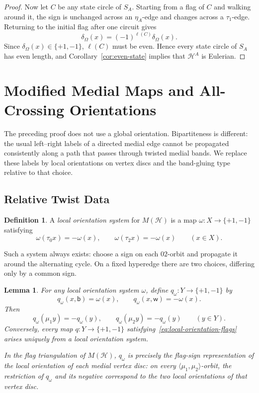\documentclass[10pt,a4paper]{article}
\newtheorem{lemma}[theorem]{Lemma}
\theoremstyle{definition}
\newtheorem{definition}[theorem]{Definition}
\theoremstyle{remark}
\newcommand{\Hcal}{\mathcal{H}}
\begin{document}
\begin{proof}
Now let $C$ be any state circle of $S_A$. Starting from a flag of $C$ and walking around it, the sign is unchanged across an $\eta_A$-edge and changes across a $\tau_1$-edge. Returning to the initial flag after one circuit gives
\[
  \delta_\Omega(x)=(-1)^{\ell(C)}\delta_\Omega(x).
\]
Since $\delta_\Omega(x)\in\{+1,-1\}$, $\ell(C)$ must be even. Hence every state circle of $S_A$ has even length, and Corollary~\ref{cor:even-state} implies that $\Hcal^A$ is Eulerian.
\end{proof}

\section{Modified Medial Maps and All-Crossing Orientations}

The preceding proof does not use a global orientation. Bipartiteness is different: the usual left--right labels of a directed medial edge cannot be propagated consistently along a path that passes through twisted medial bands. We replace these labels by local orientations on vertex discs and the band-gluing type relative to that choice.

\subsection{Relative Twist Data}

\begin{definition}\label{def:local-orientation}
A \emph{local orientation system} for $M(\Hcal)$ is a map $\omega:X\to\{+1,-1\}$ satisfying
\[
 \omega(\tau_0x)=-\omega(x),\qquad \omega(\tau_2x)=-\omega(x)
 \qquad (x\in X).
\]
\end{definition}

Such a system always exists: choose a sign on each $02$-orbit and propagate it around the alternating cycle. On a fixed hyperedge there are two choices, differing only by a common sign.

\begin{lemma}\label{lem:local-orientation-flags}
For any local orientation system $\omega$, define $q_\omega:Y\to\{+1,-1\}$ by
\[
  q_\omega(x,\mathsf b)=\omega(x),\qquad
  q_\omega(x,\mathsf w)=-\omega(x).
\]
Then
\[
  q_\omega(\mu_1y)=-q_\omega(y),\qquad
  q_\omega(\mu_2y)=-q_\omega(y)\qquad(y\in Y). \tag{L}\label{eq:local-orientation-flags}
\]
Conversely, every map $q:Y\to\{+1,-1\}$ satisfying~\eqref{eq:local-orientation-flags} arises uniquely from a local orientation system.

In the flag triangulation of $M(\Hcal)$, $q_\omega$ is precisely the flag-sign representation of the local orientation of each medial vertex disc: on every $\langle\mu_1,\mu_2\rangle$-orbit, the restriction of $q_\omega$ and its negative correspond to the two local orientations of that vertex disc.
\end{lemma}
\end{document}
